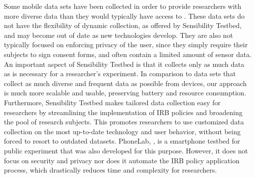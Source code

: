 

Some mobile data sets have been collected in order to provide
researchers with more diverse data than they would typically have
access to \cite{kiukkonen2010towards, wagner2014device}. These data
sets do not have the flexibility of dynamic collection, as offered by
Sensibility Testbed, and may become out of date as new
technologies develop. They are also not typically focused on enforcing
privacy of the user, since they simply require their subjects to sign
consent forms, and often contain a limited amount of sensor data. 
An important aspect of Sensibility Testbed is that it
collects only as much data as is necessary for a researcher's
experiment. In comparison to data sets that collect as much diverse
and frequent data as possible from devices, our approach is much more
scalable and usable, preserving battery and resource consumption.
Furthermore, Sensibility Testbed makes tailored data collection easy
for researchers by streamlining the implementation of IRB policies and
broadening the pool of research subjects. This promotes researchers to
use customized data collection on the most up-to-date technology and
user behavior, without being forced to resort to outdated datasets.
PhoneLab, \cite{nandugudi2013phonelab}, is a smartphone testbed for
public experiment that was also developed for this purpose. However,
it does not focus on security and privacy nor does it automate the IRB
policy application process, which drastically reduces time and
complexity for researchers.

